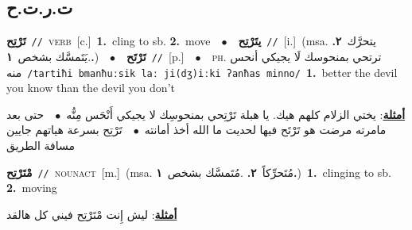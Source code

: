 \documentclass[10pt,a4paper,twoside]{article} %
\begin{document}
\begin{multicols}{2}
{{{{\vspace{-3mm}
\subsection*{\color{blue}\foreignlanguage{arabic}{ت.ر.ت.ح}\color{blue}{}} 

{\setlength\topsep{0pt}\textbf{\foreignlanguage{arabic}{تَرْتِح}}\ {\color{gray}\texttt{//}\color{black}}\ \textsc{verb}\ [c.]\ \textbf{1.}~cling to sb.  \textbf{2.}~move\ \ $\bullet$\ \ \setlength\topsep{0pt}\textbf{\foreignlanguage{arabic}{يتَرْتِح}}\ {\color{gray}\texttt{//}\color{black}}\ [i.]\ \color{gray}(msa. \foreignlanguage{arabic}{يتحرَّك}~\foreignlanguage{arabic}{\textbf{٢.}}  .\foreignlanguage{arabic}{يَتَمسَّك بشخص}~\foreignlanguage{arabic}{\textbf{١.}})\color{black}\ \ $\bullet$\ \ \setlength\topsep{0pt}\textbf{\foreignlanguage{arabic}{تَرْتَح}}\ {\color{gray}\texttt{//}\color{black}}\ [p.]\ \ $\bullet$\ \ \textsc{ph.} \color{gray} \foreignlanguage{arabic}{ترتحي بمنحوسك لَا يجيكي أنحس منه}\color{black}\ {\color{gray}\texttt{/{\sffamily tartiħi bmanħuːsik laː ji(dʒ)iːki ʔanħas minno}/}\color{black}}\ \textbf{1.}~better the devil you know than the devil you don't\  \begin{flushright}\color{gray}\foreignlanguage{arabic}{\textbf{\underline{\foreignlanguage{arabic}{أمثلة}}}: يختي الزلام كلهم هيك. يا هبلة تَرْتِحي بمنحوسِك لا يجيكي أَنْحَس مِنُّه\ $\bullet$\ \  حتى بعد مامرته مرضت هو تَرْتَح فيها لحديت ما الله أخذ أمانته\ $\bullet$\ \  تَرْتِح بسرعة هياتهم جايين مسافة الطريق}\end{flushright}\color{black}} \vspace{2mm}

{\setlength\topsep{0pt}\textbf{\foreignlanguage{arabic}{مْتَرْتِح}}\ {\color{gray}\texttt{//}\color{black}}\ \textsc{noun\textunderscore act}\ [m.]\ \color{gray}(msa. \foreignlanguage{arabic}{مُتَحرِّكاً}~\foreignlanguage{arabic}{\textbf{٢.}}  .\foreignlanguage{arabic}{مُتَمسَّك بشخص}~\foreignlanguage{arabic}{\textbf{١.}})\color{black}\ \textbf{1.}~clinging to sb.  \textbf{2.}~moving\  \begin{flushright}\color{gray}\foreignlanguage{arabic}{\textbf{\underline{\foreignlanguage{arabic}{أمثلة}}}: ليش إِنت مْتَرْتِح فيني كل هالقد}\end{flushright}\color{black}} \vspace{2mm}

}}}}
\end{multicols}
\end{document}

